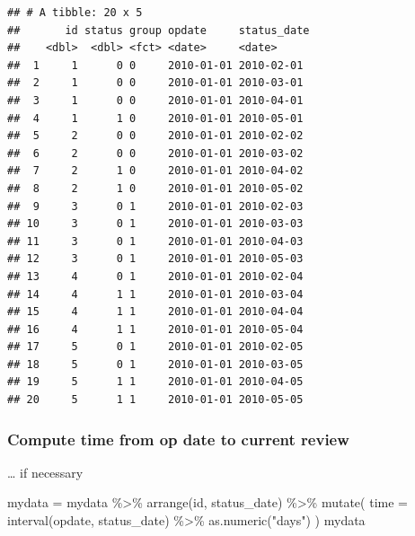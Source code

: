 \documentclass[
]{book}
\newenvironment{Shaded}{\begin{snugshade}}{\end{snugshade}}
\newcommand{\AttributeTok}[1]{\textcolor[rgb]{0.77,0.63,0.00}{#1}}
\newcommand{\FunctionTok}[1]{\textcolor[rgb]{0.00,0.00,0.00}{#1}}
\newcommand{\NormalTok}[1]{#1}
\newcommand{\OtherTok}[1]{\textcolor[rgb]{0.56,0.35,0.01}{#1}}
\newcommand{\SpecialCharTok}[1]{\textcolor[rgb]{0.00,0.00,0.00}{#1}}
\newcommand{\StringTok}[1]{\textcolor[rgb]{0.31,0.60,0.02}{#1}}
\begin{document}
\begin{verbatim}
## # A tibble: 20 x 5
##       id status group opdate     status_date
##    <dbl>  <dbl> <fct> <date>     <date>     
##  1     1      0 0     2010-01-01 2010-02-01 
##  2     1      0 0     2010-01-01 2010-03-01 
##  3     1      0 0     2010-01-01 2010-04-01 
##  4     1      1 0     2010-01-01 2010-05-01 
##  5     2      0 0     2010-01-01 2010-02-02 
##  6     2      0 0     2010-01-01 2010-03-02 
##  7     2      1 0     2010-01-01 2010-04-02 
##  8     2      1 0     2010-01-01 2010-05-02 
##  9     3      0 1     2010-01-01 2010-02-03 
## 10     3      0 1     2010-01-01 2010-03-03 
## 11     3      0 1     2010-01-01 2010-04-03 
## 12     3      0 1     2010-01-01 2010-05-03 
## 13     4      0 1     2010-01-01 2010-02-04 
## 14     4      1 1     2010-01-01 2010-03-04 
## 15     4      1 1     2010-01-01 2010-04-04 
## 16     4      1 1     2010-01-01 2010-05-04 
## 17     5      0 1     2010-01-01 2010-02-05 
## 18     5      0 1     2010-01-01 2010-03-05 
## 19     5      1 1     2010-01-01 2010-04-05 
## 20     5      1 1     2010-01-01 2010-05-05
\end{verbatim}

\hypertarget{compute-time-from-op-date-to-current-review}{%
\subsubsection{Compute time from op date to current review}\label{compute-time-from-op-date-to-current-review}}

\ldots{} if necessary

\begin{Shaded}
\begin{Highlighting}[]
\NormalTok{mydata }\OtherTok{=}\NormalTok{ mydata }\SpecialCharTok{\%\textgreater{}\%} 
  \FunctionTok{arrange}\NormalTok{(id, status\_date) }\SpecialCharTok{\%\textgreater{}\%} 
  \FunctionTok{mutate}\NormalTok{(}
    \AttributeTok{time =} \FunctionTok{interval}\NormalTok{(opdate, status\_date) }\SpecialCharTok{\%\textgreater{}\%} \FunctionTok{as.numeric}\NormalTok{(}\StringTok{"days"}\NormalTok{)}
\NormalTok{  )}
\NormalTok{mydata}
\end{Highlighting}
\end{Shaded}
\end{document}
